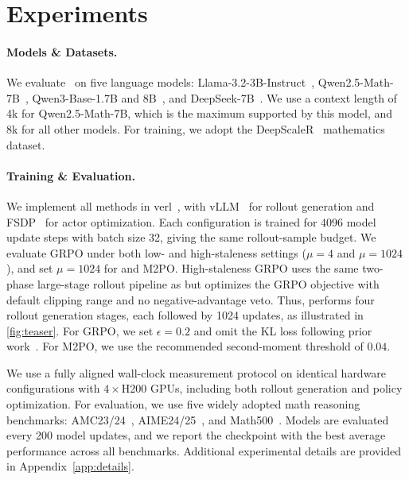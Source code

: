 \section{Experiments}
\label{sec:experiment}

\paragraph{Models \& Datasets.}
We evaluate \ourmethod\ on five language models: Llama-3.2-3B-Instruct~\citep{grattafiori2024llama3herdmodels}, Qwen2.5-Math-7B~\citep{yang2024qwen25mathtechnicalreportmathematical}, Qwen3-Base-1.7B and 8B~\citep{yang2025qwen3technicalreport}, and DeepSeek-7B~\citep{shao2024deepseekmathpushinglimitsmathematical}.
We use a context length of 4k for Qwen2.5-Math-7B, which is the maximum supported by this model, and 8k for all other models. For training, we adopt the DeepScaleR~\citep{sun2025improvingdataefficiencyllm} mathematics dataset.

\paragraph{Training \& Evaluation.}
We implement all methods in verl~\citep{Sheng_2025}, with 
vLLM~\citep{kwon2023efficientmemorymanagementlarge} for rollout generation and
FSDP~\citep{zhao2023pytorchfsdpexperiencesscaling} for actor optimization. Each
configuration is trained for 4096 model update steps with batch size 32, giving the same rollout-sample budget. We evaluate GRPO under both low- and high-staleness settings
($\mu=4$ and $\mu=1024$), and set $\mu=1024$ for \ourmethod{} and M2PO. High-staleness GRPO uses the same two-phase large-stage rollout pipeline as \ourmethod{} but optimizes the GRPO objective with default clipping range and no negative-advantage veto. Thus,
\ourmethod{} performs four rollout generation stages, each followed by 1024 updates, as illustrated in \cref{fig:teaser}. For GRPO, we set
$\epsilon=0.2$ and omit the KL loss following prior
work~\citep{yu2025dapoopensourcellmreinforcement,zheng2025prosperitycollapsefaroffpolicy}.
For M2PO, we use the recommended second-moment threshold of $0.04$.

We use a fully aligned wall-clock measurement protocol on
identical hardware configurations with $4\times$H200 GPUs, including both rollout generation and policy
optimization. For
evaluation, we use five widely adopted math reasoning benchmarks:
AMC23/24~\citep{aops_amc}, AIME24/25~\citep{aops_aime}, and
Math500~\citep{hendrycks2021measuringmathematicalproblemsolving,lightman2023letsverifystepstep}.
Models are evaluated every 200 model updates, and we report the checkpoint with
the best average performance across all benchmarks.
Additional experimental details are provided in Appendix~\ref{app:details}.

